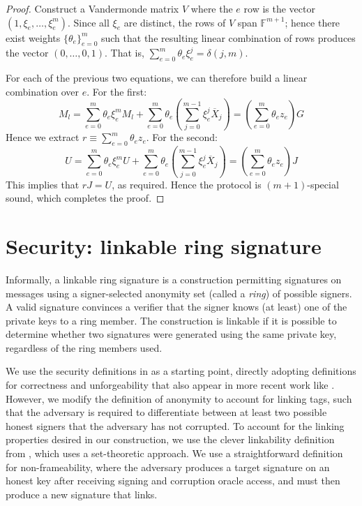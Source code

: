\documentclass{article}
\newcommand{\F}{\mathbb{F}}
\newcommand{\sumj}{\sum_{j=0}^{m-1}}
\theoremstyle{definition}
\begin{document}
\begin{proof}
Construct a Vandermonde matrix $V$ where the $e$ row is the vector $(1,\xi_e,\ldots,\xi^m_e)$.
Since all $\xi_e$ are distinct, the rows of $V$ span $\F^{m+1}$; hence there exist weights $\{\theta_e\}_{e=0}^m$ such that the resulting linear combination of rows produces the vector $(0,\ldots,0,1)$.
That is, $\sum_{e=0}^m \theta_e\xi_e^j = \delta(j,m)$.

For each of the previous two equations, we can therefore build a linear combination over $e$.
For the first:
$$M_l = \sum_{e=0}^m \theta_e\xi_e^m M_l + \sum_{e=0}^m \theta_e \left( \sumj \xi_e^j \overline{X}_j \right) = \left( \sum_{e=0}^m \theta_e z_e \right) G$$
Hence we extract $r \equiv \sum_{e=0}^m \theta_e z_e$.
For the second:
$$U = \sum_{e=0}^m \theta_e\xi_e^m U + \sum_{e=0}^m \theta_e \left( \sumj \xi_e^j \overline{X}_j \right) = \left( \sum_{e=0}^m \theta_e z_e \right) J$$
This implies that $rJ = U$, as required.
Hence the protocol is $(m+1)$-special sound, which completes the proof.
\end{proof}


\section{Security: linkable ring signature}
Informally, a linkable ring signature is a construction permitting signatures on messages using a signer-selected anonymity set (called a \textit{ring}) of possible signers.
A valid signature convinces a verifier that the signer knows (at least) one of the private keys to a ring member.
The construction is linkable if it is possible to determine whether two signatures were generated using the same private key, regardless of the ring members used.

We use the security definitions in \cite{groth} as a starting point, directly adopting definitions for correctness and unforgeability that also appear in more recent work like \cite{backes}.
However, we modify the definition of anonymity to account for linking tags, such that the adversary is required to differentiate between at least two possible honest signers that the adversary has not corrupted.
To account for the linking properties desired in our construction, we use the clever linkability definition from \cite{backes}, which uses a set-theoretic approach.
We use a straightforward definition for non-frameability, where the adversary produces a target signature on an honest key after receiving signing and corruption oracle access, and must then produce a new signature that links.
\end{document}
